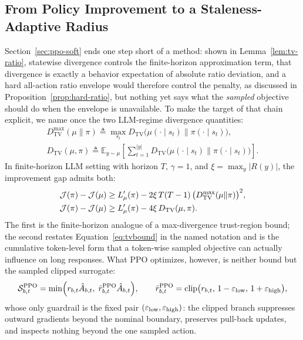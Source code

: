 \subsection{From Policy Improvement to a Staleness-Adaptive Radius}
\label{sec:satr-motivation}
Section~\ref{sec:ppo-soft} ends one step short of a method: shown in Lemma~\ref{lem:tv-ratio}, statewise divergence controls the finite-horizon approximation term, that divergence is exactly a behavior expectation of absolute ratio deviation, and a hard all-action ratio envelope would therefore control the penalty, as discussed in Proposition~\ref{prop:hard-ratio}, but nothing yet says what the \emph{sampled} objective should do when the envelope is unavailable. To make the target of that chain explicit, we name once the two LLM-regime divergence quantities:
\begin{equation}
\begin{gathered}
D_{\mathrm{TV}}^{\max}(\mu\|\pi)\triangleq \max_{s_t} D_{\mathrm{TV}}\bigl(\mu(\cdot\mid s_t)\|\pi(\cdot\mid s_t)\bigr),\\
D_{\mathrm{TV}}(\mu,\pi)\triangleq \mathbb{E}_{y\sim\mu}\!\left[\sum_{t=1}^{|y|} D_{\mathrm{TV}}\bigl(\mu(\cdot\mid s_t)\|\pi(\cdot\mid s_t)\bigr)\right].
\end{gathered}
\label{eq:satr-divergences}
\end{equation}
In finite-horizon LLM setting with horizon $T$, $\gamma=1$, and $\xi=\max_y |R(y)|$, the improvement gap admits both:
\begin{align}
\mathcal{J}(\pi)-\mathcal{J}(\mu)
&\ge L'_{\mu}(\pi)-2\xi\,T(T-1)\,\bigl(D_{\mathrm{TV}}^{\max}(\mu\|\pi)\bigr)^{2},\label{eq:satr-maxbound}\\
\mathcal{J}(\pi)-\mathcal{J}(\mu)
&\ge L'_{\mu}(\pi)-4\xi\,D_{\mathrm{TV}}(\mu,\pi).
\label{eq:satr-avgbound}
\end{align}
The first is the finite-horizon analogue of a max-divergence trust-region bound; the second restates Equation~\eqref{eq:tvbound} in the named notation and is the cumulative token-level form that a token-wise sampled objective can actually influence on long responses. What PPO optimizes, however, is neither bound but the sampled clipped surrogate:
\begin{equation}
\mathcal S^{\mathrm{PPO}}_{b,t}
=\min\!\Big(r_{b,t}\hat A_{b,t},\;\bar r^{\mathrm{PPO}}_{b,t}\hat A_{b,t}\Big),
\qquad
\bar r^{\mathrm{PPO}}_{b,t}=\operatorname{clip}\!\big(r_{b,t},\,1-\varepsilon_{\mathrm{low}},\,1+\varepsilon_{\mathrm{high}}\big),
\label{eq:ppo-objective}
\end{equation}
whose only guardrail is the fixed pair $(\varepsilon_{\mathrm{low}},\varepsilon_{\mathrm{high}})$: the clipped branch suppresses outward gradients beyond the nominal boundary, preserves pull-back updates, and inspects nothing beyond the one sampled action.
 
